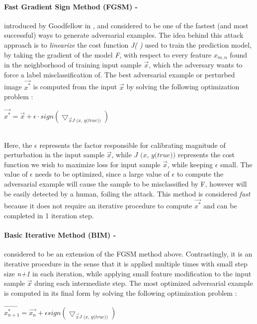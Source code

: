 \documentclass[grad,lot,lof,11pt,oneside,onehalfspace]{RUthesis}
\begin{document}
\paragraph{Fast Gradient Sign Method (FGSM) -} introduced by Goodfellow in \cite{goodfellow_explaining_2015}, and considered to be one of the fastest (and most successful) ways to generate adversarial examples. The idea behind this attack approach is to \textit{linearize} the cost function \textit{J( )} used to train the prediction model, by taking the gradient of the model \textit{F}, with respect to every feature \textit{$x_{m,n}$} found in the neighborhood of training input sample $\vec{x}$, which the adversary wants to force a label misclassification of. The best adversarial example or perturbed image $\vec{x^{*}}$ is computed from the input $\vec{x}$ by solving the following optimization problem \cite{papernot_cleverhans_2016}: \\
\newline
\centerline{$\vec{x^{*}} = \vec{x} + \epsilon \cdotp sign( \bigtriangledown_{\vec{x}\textit{J (x, y(true)})})$}
\newline\\
Here, the $\epsilon$ represents the factor responsible for calibrating magnitude of perturbation in the input sample $\vec{x}$, while $\textit{J (x, y(true))}$ represents the cost function we wish to maximize loss for input sample $\vec{x}$, while keeping $\epsilon$ small. The value of $\epsilon$ needs to be optimized, since a large value of $\epsilon$ to compute the adversarial example will cause the sample to be misclassified by F, however will be easily detected by a human, foiling the attack. This method is considered \textit{fast} because it does not require an iterative procedure to compute $\vec{x^{*}}$ and can be completed in 1 iteration step. 
\paragraph{Basic Iterative Method (BIM) -}considered to be an extension of the FGSM method above. Contrastingly, it is an iterative procedure in the sense that it is applied multiple times with small step size \textit{n+1} in each iteration, while applying small feature modification to the input sample $\vec{x}$ during each intermediate step. The most optimized adversarial example is computed in its final form by solving the following optimization problem \cite{papernot_cleverhans_2016}:\\
\newline
\centerline{$\vec{x^{*}_{n+1}} = \vec{x_{n}} + \epsilon sign( \bigtriangledown_{\vec{x}\textit{J (x, y(true))}})$}
\end{document}
